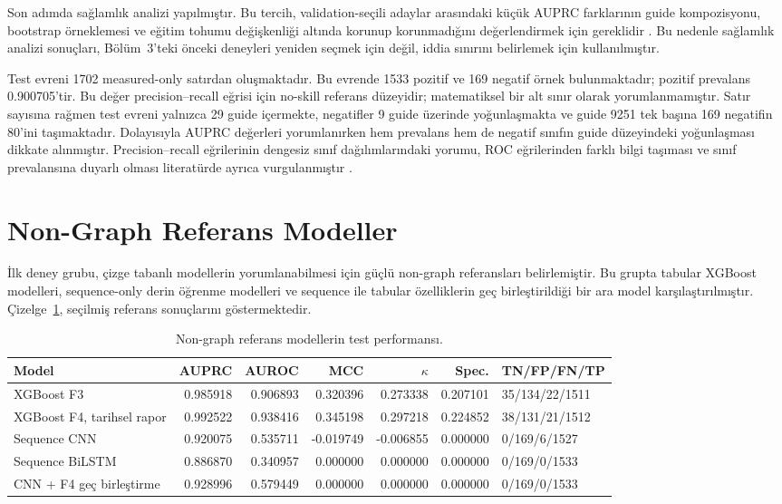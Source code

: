 Son adımda sağlamlık analizi yapılmıştır. Bu tercih, validation-seçili adaylar arasındaki küçük AUPRC farklarının guide kompozisyonu, bootstrap örneklemesi ve eğitim tohumu değişkenliği altında korunup korunmadığını değerlendirmek için gereklidir . Bu nedenle sağlamlık analizi sonuçları, Bölüm~3'teki önceki deneyleri yeniden seçmek için değil, iddia sınırını belirlemek için kullanılmıştır.

Test evreni 1702 measured-only satırdan oluşmaktadır. Bu evrende 1533 pozitif ve 169 negatif örnek bulunmaktadır; pozitif prevalans 0.900705'tir. Bu değer precision--recall eğrisi için no-skill referans düzeyidir; matematiksel bir alt sınır olarak yorumlanmamıştır. Satır sayısına rağmen test evreni yalnızca 29 guide içermekte, negatifler 9 guide üzerinde yoğunlaşmakta ve guide 9251 tek başına 169 negatifin 80'ini taşımaktadır. Dolayısıyla AUPRC değerleri yorumlanırken hem prevalans hem de negatif sınıfın guide düzeyindeki yoğunlaşması dikkate alınmıştır. Precision--recall eğrilerinin dengesiz sınıf dağılımlarındaki yorumu, ROC eğrilerinden farklı bilgi taşıması ve sınıf prevalansına duyarlı olması literatürde ayrıca vurgulanmıştır .

\section{Non-Graph Referans Modeller}

İlk deney grubu, çizge tabanlı modellerin yorumlanabilmesi için güçlü non-graph referansları belirlemiştir. Bu grupta tabular XGBoost modelleri, sequence-only derin öğrenme modelleri ve sequence ile tabular özelliklerin geç birleştirildiği bir ara model karşılaştırılmıştır. Çizelge~\ref{tab:non-graph-referanslar}, seçilmiş referans sonuçlarını göstermektedir.

\begin{table}[htbp]
\caption{Non-graph referans modellerin test performansı.}
\label{tab:non-graph-referanslar}
\centering
\scriptsize
\begin{tabularx}{\textwidth}{>{\raggedright\arraybackslash}X r r r r r l}
\toprule\toprule
Model & AUPRC & AUROC & MCC & $\kappa$ & Spec. & TN/FP/FN/TP\\
\midrule
XGBoost F3 & 0.985918 & 0.906893 & 0.320396 & 0.273338 & 0.207101 & 35/134/22/1511\\
XGBoost F4, tarihsel rapor & 0.992522 & 0.938416 & 0.345198 & 0.297218 & 0.224852 & 38/131/21/1512\\
Sequence CNN & 0.920075 & 0.535711 & -0.019749 & -0.006855 & 0.000000 & 0/169/6/1527\\
Sequence BiLSTM & 0.886870 & 0.340957 & 0.000000 & 0.000000 & 0.000000 & 0/169/0/1533\\
CNN + F4 geç birleştirme & 0.928996 & 0.579449 & 0.000000 & 0.000000 & 0.000000 & 0/169/0/1533\\
\bottomrule
\end{tabularx}
\end{table}

